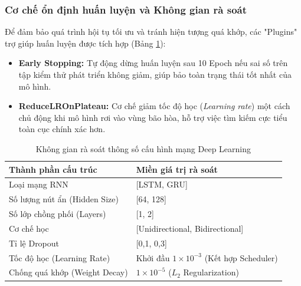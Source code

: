 \subsubsection{Cơ chế ổn định huấn luyện và Không gian rà soát}
Để đảm bảo quá trình hội tụ tối ưu và tránh hiện tượng quá khớp, các "Plugins" trợ giúp huấn luyện được tích hợp (Bảng \ref{tab:dl_search_space}):
\begin{itemize}
    \item \textbf{Early Stopping:} Tự động dừng huấn luyện sau 10 Epoch nếu sai số trên tập kiểm thử phát triển không giảm, giúp bảo toàn trạng thái tốt nhất của mô hình.
    \item \textbf{ReduceLROnPlateau:} Cơ chế giảm tốc độ học (\textit{Learning rate}) một cách chủ động khi mô hình rơi vào vùng bão hòa, hỗ trợ việc tìm kiếm cực tiểu toàn cục chính xác hơn.
\end{itemize}
\begin{table}[H]
    \centering
    \caption{Không gian rà soát thông số cấu hình mạng Deep Learning}
    \label{tab:dl_search_space}
    \begin{tabular}{|l|l|}
    \hline
    \textbf{Thành phần cấu trúc} & \textbf{Miền giá trị rà soát} \\ \hline
    Loại mạng RNN                & [LSTM, GRU] \\
    Số lượng nút ẩn (Hidden Size) & [64, 128] \\
    Số lớp chồng phối (Layers)   & [1, 2] \\
    Cơ chế học                   & [Unidirectional, Bidirectional] \\
    Tỉ lệ Dropout                & [0,1, 0,3] \\ \hline
    Tốc độ học (Learning Rate)   & Khởi đầu $1 \times 10^{-3}$ (Kết hợp Scheduler) \\
    Chống quá khớp (Weight Decay)& $1 \times 10^{-5}$ ($L_2$ Regularization) \\ \hline
    \end{tabular}
\end{table}